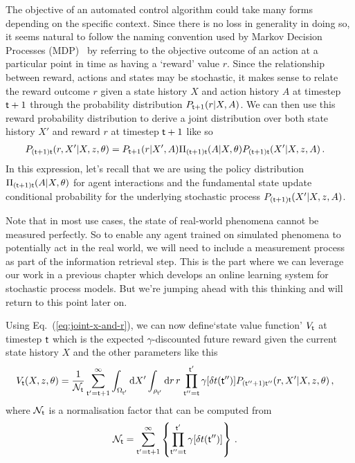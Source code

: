 The objective of an automated control algorithm could take many forms depending on the specific context. Since there is no loss in generality in doing so, it seems natural to follow the naming convention used by Markov Decision Processes (MDP)~\cite{bertsekas2011dynamic,sutton2018reinforcement} by referring to the objective outcome of an action at a particular point in time as having a `reward' value $r$. Since the relationship between reward, actions and states may be stochastic, it makes sense to relate the reward outcome $r$ given a state history $X$ and action history $A$ at timestep ${\sf t}+1$ through the probability distribution $P_{{\sf t}+1}(r\vert X,A)$. We can then use this reward probability distribution to derive a joint distribution over both state history $X'$ and reward $r$ at timestep ${\sf t}+1$ like so
\begin{align}
P_{({\sf t}+1){\sf t}}(r,X'\vert X, z,\theta) &= P_{{\sf t}+1}(r\vert X',A)\Pi_{({\sf t}+1){\sf t}}(A\vert X,\theta)P_{({\sf t}+1){\sf t}}(X'\vert X,z,A) \label{eq:joint-x-and-r}\,.
\end{align}
In this expression, let's recall that we are using the policy distribution $\Pi_{({\sf t}+1){\sf t}}(A\vert X,\theta)$ for agent interactions and the fundamental state update conditional probability for the underlying stochastic process $P_{({\sf t}+1){\sf t}}(X'\vert X,z,A)$.

Note that in most use cases, the state of real-world phenomena cannot be measured perfectly. So to enable any agent trained on simulated phenomena to potentially act in the real world, we will need to include a measurement process as part of the information retrieval step. This is the part where we can leverage our work in a previous chapter which develops an online learning system for stochastic process models. But we're jumping ahead with this thinking and will return to this point later on.

Using Eq.~(\ref{eq:joint-x-and-r}), we can now define`state value function' $V_{{\sf t}}$ at timestep ${\sf t}$ which is the expected $\gamma$-discounted future reward given the current state history $X$ and the other parameters like this
\begin{align}
V_{{\sf t}}(X,z,\theta) &= \frac{1}{{\cal N}_{{\sf t}}}\sum_{{\sf t}'={\sf t}+1}^{\infty} \int_{\Omega_{{\sf t}'}}{\rm d}X'\int_{\rho_{{\sf t}'}} {\rm d}r \,r\, \prod_{{\sf t}''={\sf t}}^{{\sf t}'} \gamma [\delta t({\sf t}'')]P_{({\sf t}''+1){\sf t}''}(r,X'\vert X, z,\theta) \,,
\end{align}
where ${\cal N}_{{\sf t}}$ is a normalisation factor that can be computed from
\begin{align}
{\cal N}_{{\sf t}} &= \sum_{{\sf t}'={\sf t}+1}^{\infty}\left\{ \prod_{{\sf t}''={\sf t}}^{{\sf t}'} \gamma [\delta t({\sf t}'')] \right\} \,.
\end{align}

